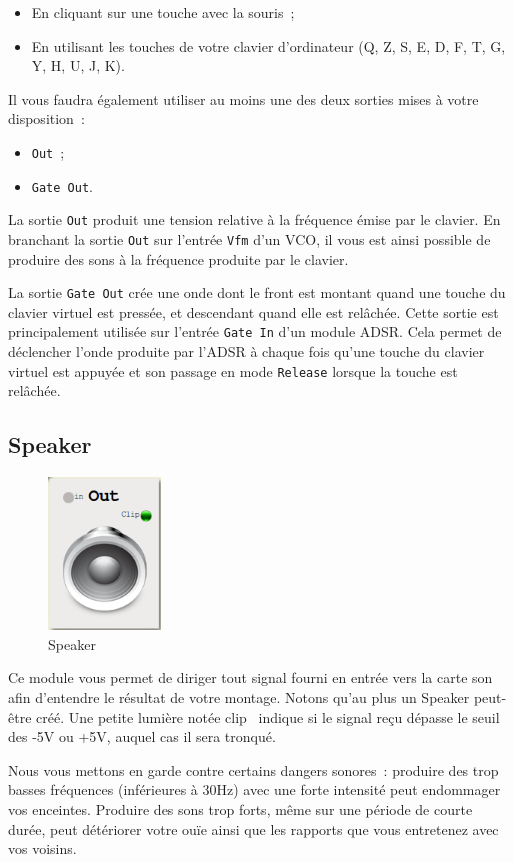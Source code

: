 \documentclass[a4paper,oneside,frenchb,10pt]{article}
\begin{document}
\begin{itemize}
\item
  En cliquant sur une touche avec la souris~;
\item
  En utilisant les touches de votre clavier d'ordinateur (Q, Z, S, E, D,
  F, T, G, Y, H, U, J, K).
\end{itemize}
Il vous faudra également utiliser au moins une des deux sorties mises à
votre disposition~:

\begin{itemize}
\item
  \verb!Out!~;
\item
  \verb!Gate Out!.
\end{itemize}
La sortie \verb!Out! produit une tension relative à la fréquence émise
par le clavier. En branchant la sortie \verb!Out! sur l'entrée
\verb!Vfm! d'un VCO, il vous est ainsi possible de produire des sons à
la fréquence produite par le clavier.

La sortie \verb!Gate Out! crée une onde dont le front est montant quand
une touche du clavier virtuel est pressée, et descendant quand elle est
relâchée. Cette sortie est principalement utilisée sur l'entrée
\verb!Gate In! d'un module ADSR. Cela permet de déclencher l'onde
produite par l'ADSR à chaque fois qu'une touche du clavier virtuel est
appuyée et son passage en mode \verb!Release! lorsque la touche est
relâchée.

\subsection{Speaker}

\begin{multicols}{2}
\begin{figure}[H]
\centering
\includegraphics[width=3cm]{../img/png/speaker.png}
\caption{Speaker}
\end{figure}

Ce module vous permet de diriger tout signal fourni en entrée vers la
carte son afin d'entendre le résultat de votre montage. Notons qu'au plus
un Speaker peut-être créé. Une petite lumière notée \guillemotleft clip\guillemotright~
indique si le signal reçu dépasse le seuil des -5V ou +5V, auquel cas il 
sera tronqué.

Nous vous mettons en garde contre certains dangers sonores~: produire
des trop basses fréquences (inférieures à 30Hz) avec une forte intensité
peut endommager vos enceintes. Produire des sons trop forts, même sur
une période de courte durée, peut détériorer votre ouïe ainsi que les
rapports que vous entretenez avec vos voisins.
\end{multicols}
\end{document}
